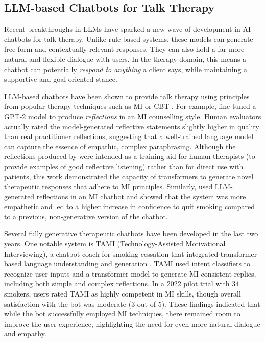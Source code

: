 \subsection{LLM-based Chatbots for Talk Therapy}
Recent breakthroughs in LLMs have sparked a new wave of development in AI chatbots for talk therapy. Unlike rule-based systems, these models can generate free-form and contextually relevant responses. They can also hold a far more natural and flexible dialogue with users. In the therapy domain, this means a chatbot can potentially \textit{respond to anything} a client says, while maintaining a supportive and goal-oriented stance. 

LLM-based chatbots have been shown to provide talk therapy using principles from popular therapy techniques such as MI or CBT \cite{mahmood-etal-2025-fully,kian2024can,Ye2025}. For example, \citet{shen-etal-2020-counseling} fine-tuned a GPT-2 model to produce \emph{reflections} in an MI counselling style. Human evaluators actually rated the model-generated reflective statements slightly higher in quality than real practitioner reflections, suggesting that a well-trained language model can capture the essence of empathic, complex paraphrasing. Although the reflections produced by \citet{shen-etal-2020-counseling} were intended as a training aid for human therapists (to provide examples of good reflective listening) rather than for direct use with patients, this work demonstrated the capacity of transformers to generate novel therapeutic responses that adhere to MI principles. Similarly, \citet{brown2023motivational} used LLM-generated reflections in an MI chatbot and showed that the system was more empathetic and led to a higher increase in confidence to quit smoking compared to a previous, non-generative version of the chatbot.


Several fully generative therapeutic chatbots have been developed in the last two years.  One notable system is TAMI (Technology-Assisted Motivational Interviewing), a chatbot coach for smoking cessation that integrated transformer-based language understanding and generation \cite{Saiyed2022}. TAMI used intent classifiers to recognize user inputs and a transformer model to generate MI-consistent replies, including both simple and complex reflections. In a 2022 pilot trial with 34 smokers, users rated TAMI as highly competent in MI skills, though overall satisfaction with the bot was moderate (3 out of 5). These findings indicated that while the bot successfully employed MI techniques, there remained room to improve the user experience, highlighting the need for even more natural dialogue and empathy.


